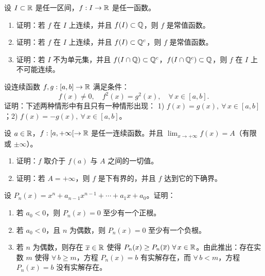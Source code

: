 \begin{exercise}
	\item 设 \(I\subset\mathbb{R}\) 是任一区间，\(f:I\to\mathbb{R}\) 是任一函数。
	\begin{enumerate}[label=\arabic*)]
		\item 证明：若 \(f\) 在 \(I\) 上连续，并且 \(f(I)\subset\mathbb{Q}\)，则 \(f\) 是常值函数。
		\item 证明：若 \(f\) 在 \(I\) 上连续，并且 \(f(I)\subset\mathbb{Q}^c\)，则 \(f\) 是常值函数。
		\item 证明：若 \(I\) 不为单元集，并且 \(f(I\cap\mathbb{Q})\subset\mathbb{Q}^c\)，\(f(I\cap\mathbb{Q}^c)\subset\mathbb{Q}\)，则 \(f\) 在 \(I\) 上不可能连续。
	\end{enumerate}
\end{exercise}

\begin{exercise}
	\item 设连续函数 \(f,g:[a,b]\to\mathbb{R}\) 满足条件：
	\[
	f(x)\neq0,\quad f^2(x)=g^2(x),\quad\forall\,x\in[a,b].
	\]
	证明：下述两种情形中有且只有一种情形出现：
	1) \(f(x)=g(x),\ \forall\,x\in[a,b]\)；2) \(f(x)=-g(x),\ \forall\,x\in[a,b]\)。
\end{exercise}

\begin{exercise}
	\item 设 \(a\in\mathbb{R}\)，\(f:[a,+\infty[\to\mathbb{R}\) 是任一连续函数。并且 \(\lim_{x\to+\infty}f(x)=A\)（有限或 \(\pm\infty\)）。
	\begin{enumerate}[label=\arabic*)]
		\item 证明：\(f\) 取介于 \(f(a)\) 与 \(A\) 之间的一切值。
		\item 证明：若 \(A=+\infty\)，则 \(f\) 是下有界的，并且 \(f\) 达到它的下确界。
	\end{enumerate}
\end{exercise}

\begin{exercise}
	\item 设 \(P_n(x)=x^n+a_{n-1}x^{n-1}+\cdots+a_1x+a_0\)。证明：
	\begin{enumerate}[label=\arabic*)]
		\item 若 \(a_0<0\)，则 \(P_n(x)=0\) 至少有一个正根。
		\item 若 \(a_0<0\)，且 \(n\) 为偶数，则 \(P_n(x)=0\) 至少有一个负根。
		\item 若 \(n\) 为偶数，则存在 \(\overline{x}\in\mathbb{R}\) 使得 \(P_n(x)\ge P_n(\overline{x})\ \forall\,x\in\R\)。由此推出：存在实数 \(m\) 使得 \(\forall\,b\ge m\)，方程 \(P_n(x)=b\) 有实解存在，而 \(\forall\,b<m\)，方程 \(P_n(x)=b\) 没有实解存在。
	\end{enumerate}
\end{exercise}

